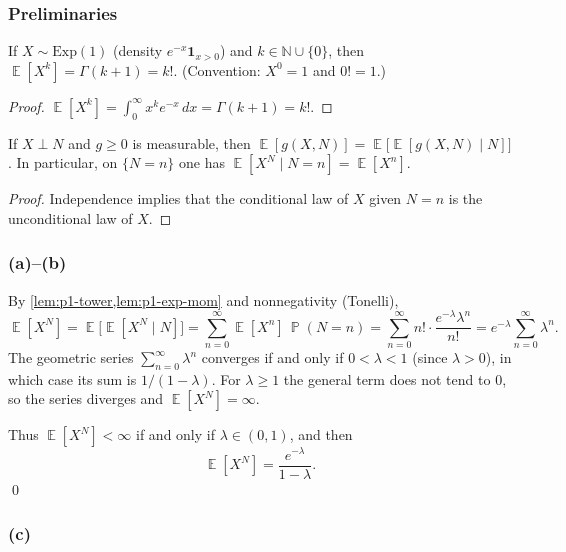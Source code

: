 \documentclass[11pt,a4paper]{article}
\DeclareMathOperator{\E}{\mathbb{E}}
\DeclareMathOperator{\Pbb}{\mathbb{P}}
\begin{document}
\setcounter{section}{1}
\setcounter{theorem}{0}
\setcounter{definition}{0}
\setcounter{remark}{0}
\setcounter{note}{0}

\subsubsection{Preliminaries}

\begin{lemma}
\label{lem:p1-exp-mom}
If \(X\sim\mathrm{Exp}(1)\) (density \(e^{-x}\mathbf{1}_{x>0}\)) and \(k\in\mathbb{N}\cup\{0\}\), then \(\E[X^k]=\Gamma(k+1)=k!\). (Convention: \(X^0=1\) and \(0!=1\).)
\end{lemma}

\begin{proof}
\(\E[X^k]=\int_0^\infty x^k e^{-x}\,dx=\Gamma(k+1)=k!\).
\end{proof}

\begin{lemma}
\label{lem:p1-tower}
If \(X\perp N\) and \(g\ge 0\) is measurable, then \(\E[g(X,N)]=\E\bigl[\E[g(X,N)\mid N]\bigr]\). In particular, on \(\{N=n\}\) one has \(\E[X^N\mid N=n]=\E[X^n]\).
\end{lemma}

\begin{proof}
Independence implies that the conditional law of \(X\) given \(N=n\) is the unconditional law of \(X\).
\end{proof}

\subsubsection{(a)--(b)}

By \cref{lem:p1-tower,lem:p1-exp-mom} and nonnegativity (Tonelli),
\[
\E[X^N]
=
\E\bigl[\E[X^N\mid N]\bigr]
=
\sum_{n=0}^\infty \E[X^n]\,\Pbb(N=n)
=
\sum_{n=0}^\infty n!\cdot\frac{e^{-\lambda}\lambda^n}{n!}
=
e^{-\lambda}\sum_{n=0}^\infty \lambda^n.
\]
The geometric series \(\sum_{n=0}^\infty\lambda^n\) converges if and only if \(0<\lambda<1\) (since \(\lambda>0\)), in which case its sum is \(1/(1-\lambda)\). For \(\lambda\ge 1\) the general term does not tend to \(0\), so the series diverges and \(\E[X^N]=\infty\).

Thus \(\E[X^N]<\infty\) if and only if \(\lambda\in(0,1)\), and then
\[
\E[X^N]
=
\frac{e^{-\lambda}}{1-\lambda}.
\]
\qed

\subsubsection{(c)}
\end{document}
